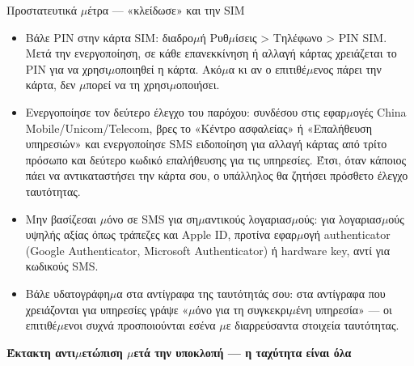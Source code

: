 \begin{tcbwarn}{Προστατευτικά $\mu$έτρα — «κλείδωσε» και την SIM}
\begin{itemize}
  \item Βάλε PIN στην κάρτα SIM: διαδρο$\mu$ή Ρυθ$\mu$ίσεις > Τηλέφωνο > PIN SIM. Μετά την ενεργοποίηση, σε κάθε επανεκκίνηση ή αλλαγή κάρτας χρειάζεται το PIN για να χρησι$\mu$οποιηθεί η κάρτα. Ακό$\mu$α κι αν ο επιτιθέ$\mu$ενος πάρει την κάρτα, δεν $\mu$πορεί να τη χρησι$\mu$οποιήσει.
  \item Ενεργοποίησε τον δεύτερο έλεγχο του παρόχου: συνδέσου στις εφαρ$\mu$ογές China Mobile/Unicom/Telecom, βρες το «Κέντρο ασφαλείας» ή «Επαλήθευση υπηρεσιών» και ενεργοποίησε SMS ειδοποίηση για αλλαγή κάρτας από τρίτο πρόσωπο και δεύτερο κωδικό επαλήθευσης για τις υπηρεσίες. Έτσι, όταν κάποιος πάει να αντικαταστήσει την κάρτα σου, ο υπάλληλος θα ζητήσει πρόσθετο έλεγχο ταυτότητας.
  \item Μην βασίζεσαι $\mu$όνο σε SMS για ση$\mu$αντικούς λογαριασ$\mu$ούς: για λογαριασ$\mu$ούς υψηλής αξίας όπως τράπεζες και Apple ID, προτίνα εφαρ$\mu$ογή authenticator (Google Authenticator, Microsoft Authenticator) ή hardware key, αντί για κωδικούς SMS.
  \item Βάλε υδατογράφη$\mu$α στα αντίγραφα της ταυτότητάς σου: στα αντίγραφα που χρειάζονται για υπηρεσίες γράψε «$\mu$όνο για τη συγκεκρι$\mu$ένη υπηρεσία» — οι επιτιθέ$\mu$ενοι συχνά προσποιούνται εσένα $\mu$ε διαρρεύσαντα στοιχεία ταυτότητας.
\end{itemize}

\end{tcbwarn}

\textbf{Έκτακτη αντι$\mu$ετώπιση $\mu$ετά την υποκλοπή — η ταχύτητα είναι όλα}\par

